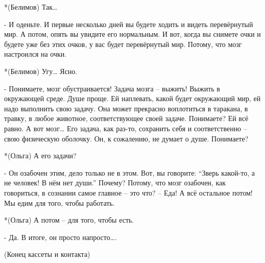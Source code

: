 *(Белимов) Так…

- И оденьте. И первые несколько дней вы будете ходить и видеть перевёрнутый мир. А потом, опять вы увидите его нормальным. И вот, когда вы снимете очки и будете уже без этих очков, у вас будет перевёрнутый мир. Потому, что мозг настроился на очки.

*(Белимов) Угу… Ясно.

- Понимаете, мозг обустраивается! Задача мозга – выжить! Выжить в окружающей среде. Душе проще. Ей наплевать, какой будет окружающий мир, ей надо выполнить свою задачу. Она может прекрасно воплотиться в таракана, в травку, в любое животное, соответствующее своей задаче. Понимаете? Ей всё равно. А вот мозг… Его задача, как раз-то, сохранить себя и соответственно – свою физическую оболочку. Он, к сожалению, не думает о душе. Понимаете?

*(Ольга) А его задачи?

- Он озабочен этим, дело только не в этом. Вот, вы говорите: “Зверь какой-то, а не человек! В нём нет души.” Почему? Потому, что мозг озабочен, как говориться, в сознании самое главное – это что? – Еда! А всё остальное потом! Мы едим для того, чтобы работать.

*(Ольга) А потом – для того, чтобы есть.

- Да. В итоге, он просто напросто….

(Конец кассеты и контакта)